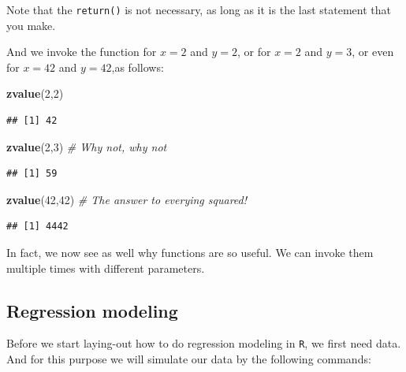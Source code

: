 \documentclass[]{article}
\newenvironment{Shaded}{\begin{snugshade}}{\end{snugshade}}
\newcommand{\KeywordTok}[1]{\textcolor[rgb]{0.13,0.29,0.53}{\textbf{#1}}}
\newcommand{\DecValTok}[1]{\textcolor[rgb]{0.00,0.00,0.81}{#1}}
\newcommand{\CommentTok}[1]{\textcolor[rgb]{0.56,0.35,0.01}{\textit{#1}}}
\newcommand{\NormalTok}[1]{#1}
\theoremstyle{definition}
\theoremstyle{definition}
\theoremstyle{definition}
\theoremstyle{remark}
\begin{document}
Note that the \texttt{return()} is not necessary, as long as it is the
last statement that you make.

And we invoke the function for \(x=2\) and \(y=2\), or for \(x=2\) and
\(y=3\), or even for \(x=42\) and \(y=42\),as follows:

\begin{Shaded}
\begin{Highlighting}[]
\KeywordTok{zvalue}\NormalTok{(}\DecValTok{2}\NormalTok{,}\DecValTok{2}\NormalTok{)}
\end{Highlighting}
\end{Shaded}

\begin{verbatim}
## [1] 42
\end{verbatim}

\begin{Shaded}
\begin{Highlighting}[]
\KeywordTok{zvalue}\NormalTok{(}\DecValTok{2}\NormalTok{,}\DecValTok{3}\NormalTok{) }\CommentTok{# Why not, why not}
\end{Highlighting}
\end{Shaded}

\begin{verbatim}
## [1] 59
\end{verbatim}

\begin{Shaded}
\begin{Highlighting}[]
\KeywordTok{zvalue}\NormalTok{(}\DecValTok{42}\NormalTok{,}\DecValTok{42}\NormalTok{) }\CommentTok{# The answer to everying squared!}
\end{Highlighting}
\end{Shaded}

\begin{verbatim}
## [1] 4442
\end{verbatim}

In fact, we now see as well why functions are so useful. We can invoke
them multiple times with different parameters.

\subsection{Regression modeling}\label{regression-modeling}

Before we start laying-out how to do regression modeling in \texttt{R},
we first need data. And for this purpose we will simulate our data by
the following commands:
\end{document}
